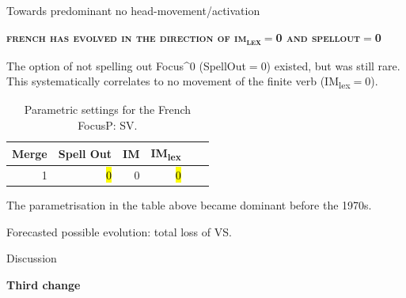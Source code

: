 \documentclass[lesson_slides]{subfiles}
\begin{document}
\begin{frame}[c]{Towards predominant no head-movement/activation}

    \textbf{\textsc{french has evolved in the direction of im\textsubscript{lex}$=$0 and spellout$=$0}}

\noindent The option of not spelling out Focus^0 (SpellOut$=$0) existed, but was still rare. This systematically correlates to no movement of the finite verb (IM\textsubscript{lex}$=$0).

\begin{table}[H]
    \centering
    \begin{tabular}{|r|r|r|r|r|r|}
    \hline
    Merge & Spell Out & IM & IM\textsubscript{lex} \\
    \hline
    1 & \hl{0} & 0 & \hl{0} \\
    \hline
    \end{tabular}
    \caption{\label{tab:samp}Parametric settings for the French FocusP: SV.}
\end{table}

\noindent The parametrisation in the table above became dominant before the 1970s. \pause

\noindent Forecasted possible evolution: total loss of VS.
  
\end{frame}
\begin{frame}[c]{Discussion}
    
\begin{center}
    \textbf{Third change}
\end{center}
  
\end{frame}
\end{document}

